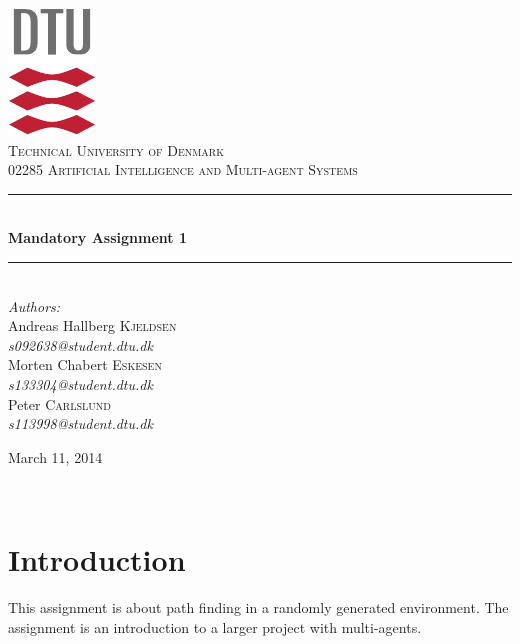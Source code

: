 \documentclass[11pt]{report}
\newcommand{\HRule}{\rule{\linewidth}{0.5mm}}
\begin{document}
\begin{titlepage}
\begin{center}

\includegraphics[scale=2.0]{../GFX/dtu_logo.pdf}\\[1cm]

\textsc{\LARGE Technical University of Denmark}\\[1.5cm]

\textsc{\Large 02285 Artificial Intelligence and Multi-agent Systems}\\[0.5cm]

\HRule \\[0.4cm]
{\huge \bfseries Mandatory Assignment 1}\\[0.1cm]
\HRule \\[1.5cm]

\large
\emph{Authors:}
\\[10pt]
Andreas Hallberg \textsc{Kjeldsen}\\
\emph{s092638@student.dtu.dk}
\\[10pt]
Morten Chabert \textsc{Eskesen}\\
\emph{s133304@student.dtu.dk}
\\[10pt]
Peter \textsc{Carlslund}\\
\emph{s113998@student.dtu.dk}

\vfill

{\large March 11, 2014}

\end{center}
\end{titlepage}

${}$
\section*{Introduction}
This assignment is about path finding in a randomly generated environment. The assignment is an introduction to a larger project with multi-agents.
\end{document}
